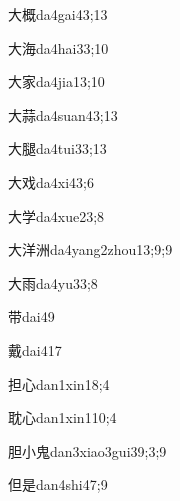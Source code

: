 \begin{verbete}{大概}{da4gai4}{3;13}
\end{verbete}
\begin{verbete}{大海}{da4hai3}{3;10}
\end{verbete}
\begin{verbete}{大家}{da4jia1}{3;10}
\end{verbete}
\begin{verbete}{大蒜}{da4suan4}{3;13}
\end{verbete}
\begin{verbete}{大腿}{da4tui3}{3;13}
\end{verbete}
\begin{verbete}{大戏}{da4xi4}{3;6}
\end{verbete}
\begin{verbete}{大学}{da4xue2}{3;8}
\end{verbete}
\begin{verbete}{大洋洲}{da4yang2zhou1}{3;9;9}
\end{verbete}
\begin{verbete}{大雨}{da4yu3}{3;8}
\end{verbete}
\begin{verbete}{带}{dai4}{9}
\end{verbete}
\begin{verbete}{戴}{dai4}{17}
\end{verbete}
\begin{verbete}{担心}{dan1xin1}{8;4}
\end{verbete}
\begin{verbete}{耽心}{dan1xin1}{10;4}
\end{verbete}
\begin{verbete}{胆小鬼}{dan3xiao3gui3}{9;3;9}
\end{verbete}
\begin{verbete}{但是}{dan4shi4}{7;9}
\end{verbete}
